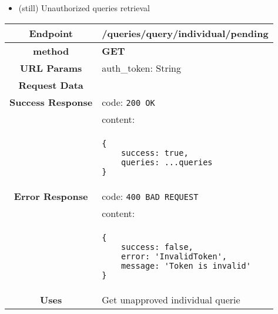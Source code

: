     
        \begin{itemize}
        \item (still) Unauthorized queries retrieval
    \end{itemize}
    \begin{adjustwidth}{1cm}{}
        \begin{longtable}{|c|l|}
            \hline
            \textbf{Endpoint} & /queries/query/individual/pending\\
            \hline
            \textbf{method} & \textbf{GET} \\
            \hline
            \textbf{URL Params} &  auth\_token: String \\
            \hline
            \textbf{Request Data} & \\
            \hline
            \textbf{Success Response} & code: \texttt{200 OK} \\
            &                           content: \\
            & \begin{minipage}[t]{0.5\textwidth}
                \begin{adjustwidth}{1.5cm}{}
                \begin{verbatim}
{
    success: true, 
    queries: ...queries
}
                \end{verbatim}
                \end{adjustwidth}
              \end{minipage} \\
              \hline
            \textbf{Error Response} & code: \texttt{400 BAD REQUEST} \\
              &                     content: \\
              & \begin{minipage}[t]{0.7\textwidth}
                \begin{adjustwidth}{1.5cm}{}
                \begin{verbatim}
{
    success: false, 
    error: 'InvalidToken',
    message: 'Token is invalid'
}
                \end{verbatim}
                \end{adjustwidth}
                 \vspace{4pt}
              \end{minipage} \\
              \hline
            \textbf{Uses} & Get unapproved individual querie \\
            \hline
        \end{longtable}
    \end{adjustwidth}
    
